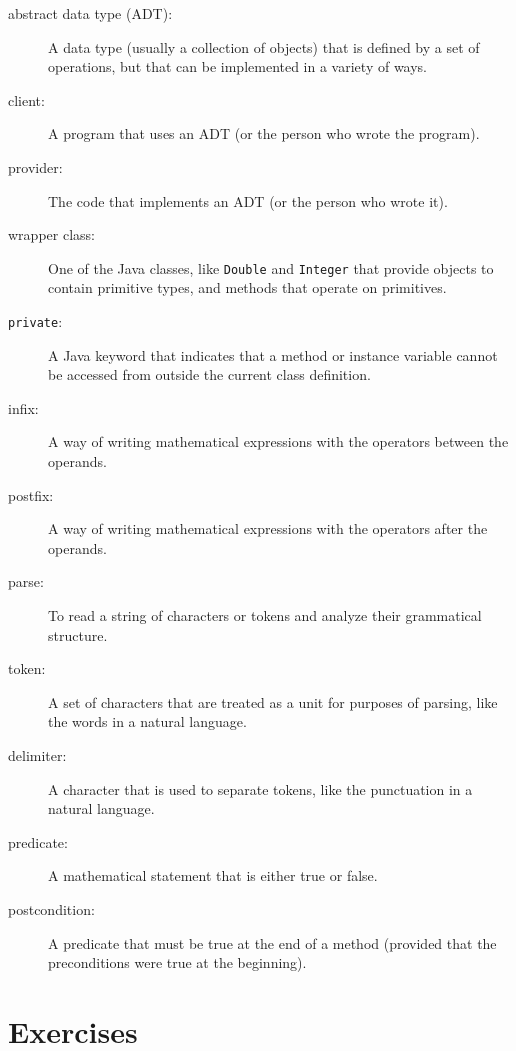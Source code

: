 \documentclass[12pt]{book}
\theoremstyle{exercise}
\begin{document}
\begin{description}

\item[abstract data type (ADT):]  A data type (usually a collection
of objects) that is defined by a set of operations, but that can
be implemented in a variety of ways.

\item[client:]  A program that uses an ADT (or the person who wrote
the program).

\item[provider:]  The code that implements an ADT (or the person
who wrote it).

\item[wrapper class:]  One of the Java classes, like {\tt Double}
and {\tt Integer} that provide objects to contain primitive types,
and methods that operate on primitives.

\item[{\tt private}:]  A Java keyword that indicates that a method
or instance variable cannot be accessed from outside the current
class definition.

\item[infix:]  A way of writing mathematical expressions with the
operators between the operands.

\item[postfix:]  A way of writing mathematical expressions with the
operators after the operands.

\item[parse:]  To read a string of characters or tokens and analyze
their grammatical structure.

\item[token:]  A set of characters that are treated as a unit for
purposes of parsing, like the words in a natural language.

\item[delimiter:]  A character that is used to separate tokens,
like the punctuation in a natural language.

\item[predicate:]  A mathematical statement that is either true or
false.

\item[postcondition:]  A predicate that must be true at the end of
a method (provided that the preconditions were true at the
beginning).


\end{description}


\section{Exercises}
\end{document}
